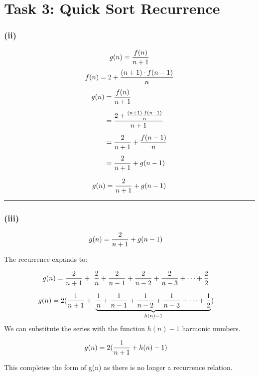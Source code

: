 \chapter{Task 3: Quick Sort Recurrence}

\subsection*{(ii)}
$$g(n) ={f(n)\over n+1 }$$
$$f(n) =2+{(n+1) \cdot f(n-1)\over n } $$
\begin{align*}
    g(n) & ={f(n)\over n+1 } \\[5pt]
         & ={2+{(n+1) \cdot f(n-1)\over n } \over n+1 }\\[5pt]
         & ={2 \over n+1} + {f(n-1) \over n} \\[5pt]
         & ={2 \over n+1} + {g(n-1)} \\[5pt]
\end{align*}
$$ g(n)={2 \over n+1} + {g(n-1)}\\[5pt]$$

\hrule

\subsection*{(iii)}

\begin{align*}
    g(n) & ={2 \over n+1} + {g(n-1)}
\end{align*}

The recurrence expands to:

\begin{align*}
    g(n) & = 
       {2 \over n+1} +\
       {2 \over n} +
       {2 \over n-1} +
       {2 \over n-2} +
       {2 \over n-3} +
       \dots +
       {2 \over 2}
\end{align*}

\begin{align*}
    g(n) & = 2 (
       {1 \over n+1} +\
       \underbrace{
       {1 \over n} +
       {1 \over n-1} +
       {1 \over n-2} +
       {1 \over n-3} +
       \dots +
       {1 \over 2}
       }_{h(n) - 1}
    )
\end{align*}
We can substitute the series with the function $h(n)-1$ harmonic numbers.

\begin{align*}
    g(n) & = 2 
    (
       {1 \over n+1} +
       h(n) -1
    )
\end{align*}

This completes the form of g(n) as there is no longer a recurrence relation.

